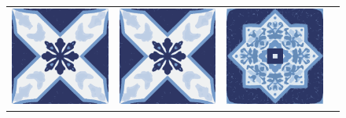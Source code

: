 \documentclass{oci}
\begin{document}
\begin{problemDescription}
\begin{figure}[h]
\begin{center}
{\begin{tabular}{cccc}
        \includegraphics[scale=0.3]{b.eps} &
        \includegraphics[scale=0.3]{b.eps} &
        \includegraphics[scale=0.3]{a.eps} \\

\end{tabular}}
\end{center}
\end{figure}
\end{problemDescription}
\end{document}
